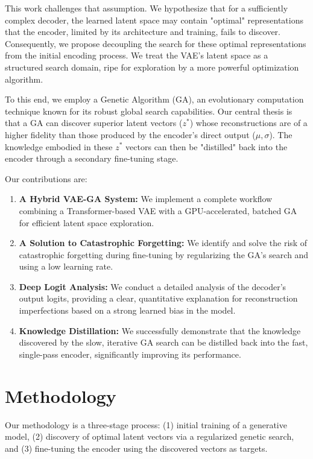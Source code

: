 \documentclass[11pt, a4paper, twocolumn]{article}
\begin{document}
This work challenges that assumption. We hypothesize that for a sufficiently complex decoder, the learned latent space may contain "optimal" representations that the encoder, limited by its architecture and training, fails to discover. Consequently, we propose decoupling the search for these optimal representations from the initial encoding process. We treat the VAE's latent space as a structured search domain, ripe for exploration by a more powerful optimization algorithm.

To this end, we employ a Genetic Algorithm (GA), an evolutionary computation technique known for its robust global search capabilities. Our central thesis is that a GA can discover superior latent vectors ($z^*$) whose reconstructions are of a higher fidelity than those produced by the encoder's direct output ($\mu, \sigma$). The knowledge embodied in these $z^*$ vectors can then be "distilled" back into the encoder through a secondary fine-tuning stage.

Our contributions are:
\begin{enumerate}
    \item \textbf{A Hybrid VAE-GA System:} We implement a complete workflow combining a Transformer-based VAE with a GPU-accelerated, batched GA for efficient latent space exploration.
    \item \textbf{A Solution to Catastrophic Forgetting:} We identify and solve the risk of catastrophic forgetting during fine-tuning by regularizing the GA's search and using a low learning rate.
    \item \textbf{Deep Logit Analysis:} We conduct a detailed analysis of the decoder's output logits, providing a clear, quantitative explanation for reconstruction imperfections based on a strong learned bias in the model.
    \item \textbf{Knowledge Distillation:} We successfully demonstrate that the knowledge discovered by the slow, iterative GA search can be distilled back into the fast, single-pass encoder, significantly improving its performance.
\end{enumerate}

\section{Methodology}
Our methodology is a three-stage process: (1) initial training of a generative model, (2) discovery of optimal latent vectors via a regularized genetic search, and (3) fine-tuning the encoder using the discovered vectors as targets.
\end{document}
